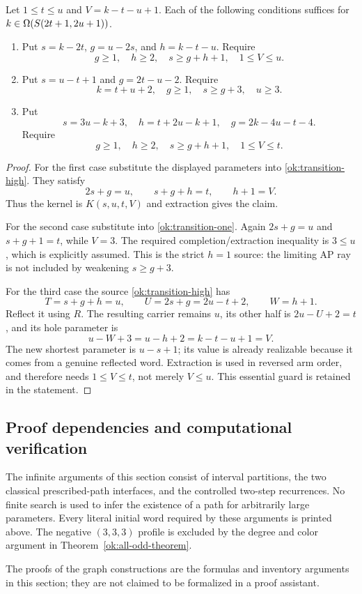 \begin{proposition}\label{ok:asymmetric-pair-bands}
Let $1\le t\le u$ and $V=k-t-u+1$.
Each of the following conditions suffices for
$k\in\Omega(S\!\left(2t+1,2u+1\right))$.
\begin{enumerate}
\item Put $s=k-2t$, $g=u-2s$, and $h=k-t-u$.
Require
\[
 g\ge1,\quad h\ge2,\quad s\ge g+h+1,\quad1\le V\le u.
 \]
\item Put $s=u-t+1$ and $g=2t-u-2$.
Require
\[
 k=t+u+2,\quad g\ge1,\quad s\ge g+3,\quad u\ge3.
 \]
\item Put
\[
 s=3u-k+3,\quad h=t+2u-k+1,\quad
 g=2k-4u-t-4.
 \]
Require
\[
 g\ge1,\quad h\ge2,\quad s\ge g+h+1,\quad1\le V\le t.
 \]
\end{enumerate}
\end{proposition}
\begin{proof}
For the first case substitute the displayed parameters into
\eqref{ok:transition-high}. They satisfy
\[
 2s+g=u,\qquad s+g+h=t,\qquad h+1=V.
 \]
Thus the kernel is $K(s,u,t,V)$ and extraction gives the claim.

For the second case substitute into \eqref{ok:transition-one}.
Again $2s+g=u$ and $s+g+1=t$, while $V=3$.
The required completion/extraction inequality is $3\le u$,
which is explicitly assumed. This is the strict $h=1$ source:
the limiting AP ray is not included by weakening $s\ge g+3$.

For the third case the source \eqref{ok:transition-high} has
\[
 T=s+g+h=u,\qquad U=2s+g=2u-t+2,\qquad W=h+1.
 \]
Reflect it using $R$. The resulting carrier remains $u$, its
other half is $2u-U+2=t$, and its hole parameter is
\[
 u-W+3=u-h+2=k-t-u+1=V.
 \]
The new shortest parameter is $u-s+1$; its value is already
realizable because it comes from a genuine reflected word.
Extraction is used in reversed arm order, and therefore needs
$1\le V\le t$, not merely $V\le u$.
This essential guard is retained in the statement.
\end{proof}

\subsection{Proof dependencies and computational verification}
\label{ok:verification}

The infinite arguments of this section consist of interval
partitions, the two classical prescribed-path interfaces, and the
controlled two-step recurrences. No finite search is used to infer
the existence of a path for arbitrarily large parameters.
Every literal initial word required by these arguments is printed
above. The negative $(3,3,3)$ profile is excluded by the degree and
color argument in Theorem~\ref{ok:all-odd-theorem}.

The proofs
of the graph constructions are the formulas and inventory arguments
in this section; they are not claimed to be formalized in a proof
assistant.
